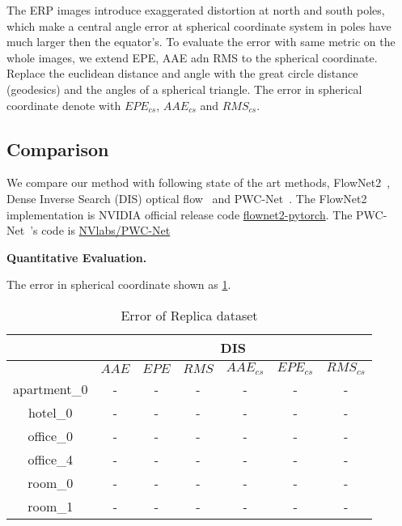The ERP images introduce exaggerated distortion at north and south poles, which make a central angle error at spherical coordinate system in poles have much larger then the equator's.
To evaluate the error with same metric on the whole images, we extend EPE, AAE adn RMS to the spherical coordinate. 
Replace the euclidean distance and angle with the great circle distance (geodesics) and the angles of a spherical triangle. 
The error in spherical coordinate denote with $EPE_{cs}$, $AAE_{cs}$ and $RMS_{cs}$.

\subsection{Comparison}

We compare our method with following state of the art methods, FlowNet2~\cite{IlgMSKDB2017}, Dense Inverse Search (DIS) optical flow~\cite{KroegTDV2016} and PWC-Net~\cite{SunYLK2018}. 
The FlowNet2~\cite{IlgMSKDB2017} implementation is NVIDIA official release code \href{https://github.com/NVIDIA/flownet2-pytorch}{flownet2-pytorch}.
The PWC-Net~\cite{SunYLK2018}'s code is \href{https://github.com/NVlabs/PWC-Net}{NVlabs/PWC-Net}


\textbf{Quantitative Evaluation.}


The error in spherical coordinate shown as \cref{fig:exp:quality}.



\begin{table}[h!]
	\centering
	\begin{tabular}{ c | c | c | c | c | c | c }
		\hline
		& \multicolumn{6}{c}{DIS}  \\
		\hline
		& ${AAE}$ & ${EPE}$ & ${RMS}$ & ${AAE_{cs}}$ & ${EPE_{cs}}$ & ${RMS_{cs}}$ \\
		\hline
		apartment\_0 & - & - & -  & - & - & -  \\ 
		\hline
		hotel\_0 & - & - & -  & - & - & -  \\ 
		\hline
		office\_0 & - & - & - & - & - & -  \\ 
		\hline
		office\_4 & - & - & -  & - & - & -  \\ 
		\hline
		room\_0 & - & - & - & - & - & -  \\ 
		\hline
		room\_1 & - & - & -  & - & - & -  \\ 
		\hline\hline
	\end{tabular}
	\caption{Error of Replica dataset}
	\label{fig:exp:quality}
\end{table}


